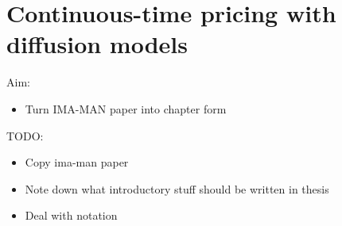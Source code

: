 \documentclass[main.tex]{subfiles}
\begin{document}
\chapter{Continuous-time pricing with diffusion
  models}\label{ch:cts_control}


Aim:
\begin{itemize}
\item Turn IMA-MAN paper into chapter form
\end{itemize}

TODO:
\begin{itemize}
\item Copy ima-man paper
\item Note down what introductory stuff should be written in thesis
\item Deal with notation
\end{itemize}

\biblio{} %
\end{document}

